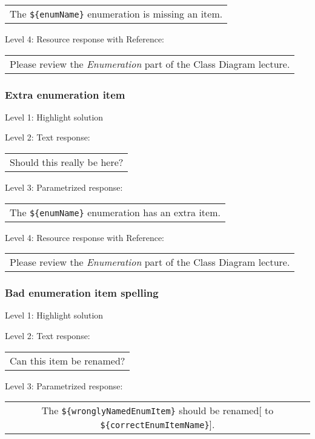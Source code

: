 \begin{tabular}{|c}
The \verb|${enumName}| enumeration is missing an item.
\end{tabular} \medskip

\noindent Level 4: Resource response with Reference:

\begin{tabular}{|c}
Please review the \textit{Enumeration} part of the Class Diagram lecture.
\end{tabular} \medskip


\subsubsection{Extra enumeration item}

\noindent Level 1: Highlight solution \medskip

\noindent Level 2: Text response: \medskip

\begin{tabular}{|c}
Should this really be here?
\end{tabular} \medskip

\noindent Level 3: Parametrized response: \medskip

\begin{tabular}{|c}
The \verb|${enumName}| enumeration has an extra item.
\end{tabular} \medskip

\noindent Level 4: Resource response with Reference:

\begin{tabular}{|c}
Please review the \textit{Enumeration} part of the Class Diagram lecture.
\end{tabular} \medskip


\subsubsection{Bad enumeration item spelling}

\noindent Level 1: Highlight solution \medskip

\noindent Level 2: Text response: \medskip

\begin{tabular}{|c}
Can this item be renamed?
\end{tabular} \medskip

\noindent Level 3: Parametrized response: \medskip

\begin{tabular}{|c}
The \verb|${wronglyNamedEnumItem}| should be renamed[ to \verb|${correctEnumItemName}|].
\end{tabular} \medskip


